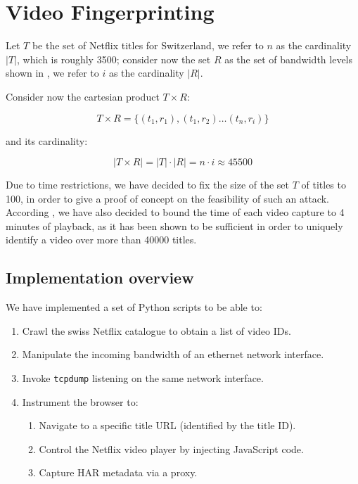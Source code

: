 \section{Video Fingerprinting}

Let $T$ be the set of Netflix titles for Switzerland, we refer to $n$ as the
cardinality $|T|$, which is roughly 3500; consider now the set $R$ as the set of
bandwidth levels shown in , we refer to $i$ as the
cardinality $|R|$.

Consider now the cartesian product $T \times R$:

\begin{equation*}
T \times R = \{(t_1, r_1), (t_1, r_2) \dots (t_n, r_i)\} 
\end{equation*}

and its cardinality:

\begin{equation*}
|T \times R| = |T| \cdot |R| = n \cdot i \approx 45500
\end{equation*}

Due to time restrictions, we have decided to fix the size of the set $T$ of
titles to 100, in order to give a proof of concept on the feasibility of such
an attack.  According \cite{netflix-real-time}, we have also decided to bound
the time of each video capture to 4 minutes of playback, as it has been shown
to be sufficient in order to uniquely identify a video over more than 40000
titles.

\subsection{Implementation overview}

We have implemented a set of Python scripts to be able to:

\begin{enumerate}
    \item Crawl the swiss Netflix catalogue to obtain a list of video IDs.
    \item Manipulate the incoming bandwidth of an ethernet network interface.
    \item Invoke \texttt{tcpdump} listening on the same network interface.
    \item Instrument the browser to:
        \begin{enumerate}
            \item Navigate to a specific title URL (identified by the title ID).
            \item Control the Netflix video player by injecting JavaScript code.
            \item Capture HAR metadata via a proxy.
        \end{enumerate}
\end{enumerate}


